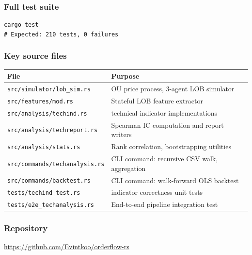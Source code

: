 \documentclass[12pt,a4paper]{article}
\theoremstyle{definition}
\theoremstyle{remark}
\newcommand{\code}[1]{\texttt{\small #1}}
\begin{document}
\subsubsection*{Full test suite}
\begin{verbatim}
cargo test
# Expected: 210 tests, 0 failures
\end{verbatim}

\subsubsection*{Key source files}

\small\setlength{\tabcolsep}{5pt}
\begin{tabular}{l>{\RaggedRight\arraybackslash}p{7cm}}
\toprule
\textbf{File} & \textbf{Purpose} \\
\midrule
\code{src/simulator/lob\_sim.rs}     & OU price process, 3-agent LOB simulator \\
\code{src/features/mod.rs}           & Stateful LOB feature extractor \\
\code{src/analysis/techind.rs}       & 87 technical indicator implementations \\
\code{src/analysis/techreport.rs}    & Spearman IC computation and report writers \\
\code{src/analysis/stats.rs}         & Rank correlation, bootstrapping utilities \\
\code{src/commands/techanalysis.rs}  & CLI command: recursive CSV walk, aggregation \\
\code{src/commands/backtest.rs}      & CLI command: walk-forward OLS backtest \\
\code{tests/techind\_test.rs}        & 35 indicator correctness unit tests \\
\code{tests/e2e\_techanalysis.rs}    & End-to-end pipeline integration test \\
\bottomrule
\end{tabular}

\subsubsection*{Repository}
\url{https://github.com/Evintkoo/orderflow-rs}
\end{document}
